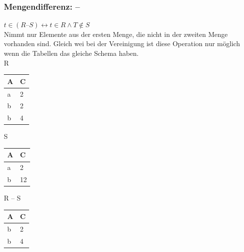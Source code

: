 \documentclass{article}
\begin{document}
 	\subsubsection{Mengendifferenz: --}
 	$t\in (R\text{--}S) \leftrightarrow t\in R \land T \notin S$ \\
 	Nimmt nur Elemente aus der ersten Menge, die nicht in der zweiten Menge vorhanden sind.
 	Gleich wei bei der Vereinigung ist diese Operation nur möglich wenn die Tabellen das gleiche Schema haben. \\
 	R
 	 \begin{tabular}{| l | l |}
 		\toprule
 		A & C  \\ \midrule
 		a & 2  \\
 		b & 2 \\
 		b & 4 \\
 		\bottomrule
 	\end{tabular} \hspace{0.5cm}
 	S
 	\begin{tabular}{| l | l |}
 		\toprule
 		A & C  \\ \midrule
 		a & 2  \\
 		b & 12 \\
 		\bottomrule
 	\end{tabular} \hspace{0.5cm}
 	R -- S
 	\begin{tabular}{| l | l |}
 		\toprule
 		A & C  \\ \midrule
 		b & 2 \\
 		b & 4 \\
 		\bottomrule
 	\end{tabular}
\end{document}
